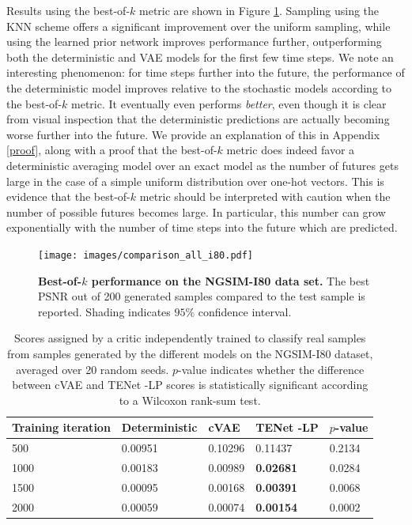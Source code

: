 \documentclass{article}
\newcommand{\modelname}{TENet }
\begin{document}
Results using the best-of-$k$ metric are shown in Figure \ref{best-of-k-i80}.
Sampling using the KNN scheme offers a significant improvement over the uniform sampling, while using the learned prior network improves performance further, outperforming both the deterministic and VAE models for the first few time steps.
We note an interesting phenomenon: for time steps further into the future, the performance of the deterministic model improves relative to the stochastic models according to the best-of-$k$ metric. It eventually even performs \emph{better}, even though it is clear from visual inspection that the deterministic predictions are actually becoming worse further into the future.
We provide an explanation of this in Appendix \ref{proof}, along with a proof that the best-of-$k$ metric does indeed favor a deterministic averaging model over an exact model as the number of futures gets large in the case of a simple uniform distribution over one-hot vectors.
This is evidence that the best-of-$k$ metric should be interpreted with caution when the number of possible futures becomes large.
In particular, this number can grow exponentially with the number of time steps into the future which are predicted.


\begin{figure}[t!]
  \centering
  \texttt{[image: images/comparison\_all\_i80.pdf]}
  \caption{
    \textbf{Best-of-$k$ performance on the NGSIM-I80 data set.}
    The best PSNR out of 200 generated samples compared to the test sample is reported.
    Shading indicates $95\%$ confidence interval.
  }
  \label{best-of-k-i80}
\end{figure}

\begin{table}[t!]
  \caption{Scores assigned by a critic independently trained to classify real samples from samples generated by the different models on the NGSIM-I80 dataset, averaged over 20 random seeds. $p$-value indicates whether the difference between cVAE and \modelname-LP scores is statistically significant according to a Wilcoxon rank-sum test.}
  \label{critic-table}
  \centering
  \begin{tabular}{l|l|lll}
    \toprule
    Training iteration     & Deterministic & cVAE & \modelname-LP & $p$-value \\
    \midrule
    500 & 0.00951 & 0.10296 & 0.11437 & 0.2134 \\
    1000 & 0.00183 & 0.00989 & \textbf{0.02681} & 0.0284 \\
    1500 & 0.00095 & 0.00168 & \textbf{0.00391} & 0.0068 \\
    2000 & 0.00059 & 0.00074 & \textbf{0.00154} & 0.0002 \\
    \bottomrule
  \end{tabular}
\end{table}
\end{document}
